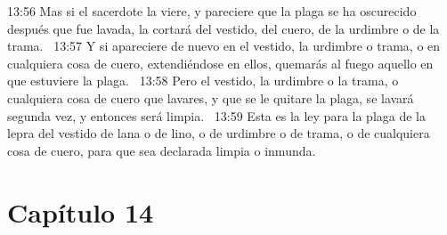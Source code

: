 13:56 Mas si el sacerdote la viere, y pareciere que la plaga se ha oscurecido después que fue lavada, la cortará del vestido, del cuero, de la urdimbre o de la trama.  
13:57 Y si apareciere de nuevo en el vestido, la urdimbre o trama, o en cualquiera cosa de cuero, extendiéndose en ellos, quemarás al fuego aquello en que estuviere la plaga.  
13:58 Pero el vestido, la urdimbre o la trama, o cualquiera cosa de cuero que lavares, y que se le quitare la plaga, se lavará segunda vez, y entonces será limpia.  
13:59 Esta es la ley para la plaga de la lepra del vestido de lana o de lino, o de urdimbre o de trama, o de cualquiera cosa de cuero, para que sea declarada limpia o inmunda.  
\section*{Capítulo 14}

